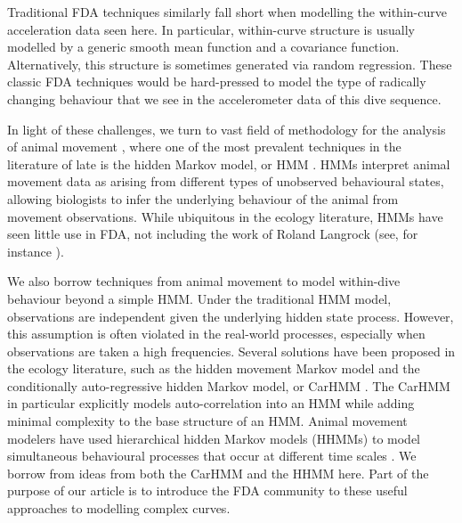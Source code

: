 Traditional FDA techniques similarly fall short when modelling the within-curve acceleration data seen here. In particular, within-curve structure is usually modelled by a generic smooth mean function and a covariance function. Alternatively, this structure is sometimes generated via random regression. These classic FDA techniques would be hard-pressed to model the type of radically changing behaviour that we see in the accelerometer data of this dive sequence.

In light of these challenges, we turn to vast field of methodology for the analysis of animal movement \citep{Hooten:2017,Mcclintock:2020}, where one of the most prevalent techniques in the literature of late is the hidden Markov model, or HMM \citep{Patterson:2017}. HMMs interpret animal movement data as arising from different types of unobserved behavioural states, allowing biologists to infer the underlying behaviour of the animal from movement observations. While ubiquitous in the ecology literature, HMMs have seen little use in FDA, not including the work of Roland Langrock (see, for instance \citealt{Langrock:2018}).

%

We also borrow techniques from animal movement to model within-dive behaviour beyond a simple HMM. Under the traditional HMM model, observations are independent given the underlying hidden state process. However, this assumption is often violated in the real-world processes, especially when observations are taken a high frequencies. Several solutions have been proposed in the ecology literature, such as the hidden movement Markov model \citep{Whoriskey:2016} and the conditionally auto-regressive hidden Markov model, or CarHMM \citep{Lawler:2019}. The CarHMM in particular explicitly models auto-correlation into an HMM while adding minimal complexity to the base structure of an HMM. Animal movement modelers have used hierarchical hidden Markov models (HHMMs) to model simultaneous behavioural processes that occur at different time scales \citep{Barajas:2017,Adam:2019}. We borrow from ideas from both the CarHMM and the HHMM here. Part of the purpose of our article is to introduce the FDA community to these useful approaches to modelling complex curves.

